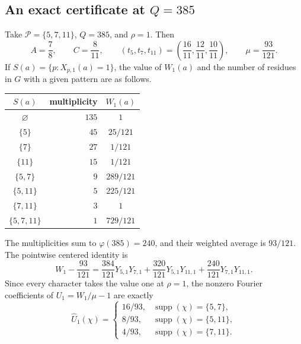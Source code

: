 \subsection{An exact certificate at \texorpdfstring{$Q=385$}{Q=385}}
\label{subsec:wt-385-certificate}

Take $\mathcal P=\{5,7,11\}$, $Q=385$, and $\rho=1$.  Then
\begin{equation}
 A=\frac78,
 \qquad
 C=\frac8{11},
 \qquad
 (t_5,t_7,t_{11})
 =\left(\frac{16}{11},\frac{12}{11},\frac{10}{11}\right),
 \qquad
 \mu=\frac{93}{121}.
 \label{eq:wt-385-parameters}
\end{equation}
If $S(a)=\{p:X_{p,1}(a)=1\}$, the value of $W_1(a)$ and the number of
residues in $G$ with a given pattern are as follows.
\begin{center}
\begin{tabular}{c@{\qquad}r@{\qquad}c}
\toprule
$S(a)$ & multiplicity & $W_1(a)$\\
\midrule
$\varnothing$ & $135$ & $1$\\
$\{5\}$ & $45$ & $25/121$\\
$\{7\}$ & $27$ & $1/121$\\
$\{11\}$ & $15$ & $1/121$\\
$\{5,7\}$ & $9$ & $289/121$\\
$\{5,11\}$ & $5$ & $225/121$\\
$\{7,11\}$ & $3$ & $1$\\
$\{5,7,11\}$ & $1$ & $729/121$\\
\bottomrule
\end{tabular}
\end{center}
The multiplicities sum to $\varphi(385)=240$, and their weighted average is
$93/121$.  The pointwise centered identity is
\begin{equation}
 W_1-\frac{93}{121}
 =\frac{384}{121}Y_{5,1}Y_{7,1}
  +\frac{320}{121}Y_{5,1}Y_{11,1}
  +\frac{240}{121}Y_{7,1}Y_{11,1}.
 \label{eq:wt-385-pointwise-identity}
\end{equation}
Since every character takes the value one at $\rho=1$, the nonzero Fourier
coefficients of $U_1=W_1/\mu-1$ are exactly
\begin{equation}
 \widehat U_1(\chi)=
 \begin{cases}
 16/93,&\operatorname{supp}(\chi)=\{5,7\},\\
 8/93,&\operatorname{supp}(\chi)=\{5,11\},\\
 4/93,&\operatorname{supp}(\chi)=\{7,11\}.
 \end{cases}
 \label{eq:wt-385-fourier-coefficients}
\end{equation}
